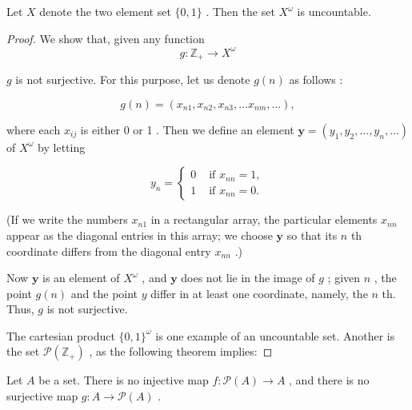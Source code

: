 \begin{theorem} Let \(X\) denote the two element set \(\{ 0,1\}\) . Then the set \({X}^{\omega }\) is uncountable.
\end{theorem}

\begin{proof}We show that, given any function
\[
g : {\mathbb{Z}}_{ + } \rightarrow  {X}^{\omega }
\]

\(g\) is not surjective. For this purpose, let us denote \(g\left( n\right)\) as follows :

\[
g\left( n\right)  = \left( {{x}_{n1},{x}_{n2},{x}_{n3},\ldots {x}_{nm},\ldots }\right) ,
\]

where each \({x}_{ij}\) is either 0 or 1 . Then we define an element \(\mathbf{y} = \left( {{y}_{1},{y}_{2},\ldots ,{y}_{n},\ldots }\right)\) of \({X}^{\omega }\) by letting

\[
{y}_{n} = \left\{  \begin{array}{ll} 0 & \text{ if }{x}_{nn} = 1, \\  1 & \text{ if }{x}_{nn} = 0. \end{array}\right.
\]

(If we write the numbers \({x}_{n1}\) in a rectangular array, the particular elements \({x}_{nn}\) appear as the diagonal entries in this array; we choose \(\mathbf{y}\) so that its \(n\) th coordinate differs from the diagonal entry \({x}_{nn}\) .)

Now \(\mathbf{y}\) is an element of \({X}^{\omega }\) , and \(\mathbf{y}\) does not lie in the image of \(g\) ; given \(n\) , the point \(g\left( n\right)\) and the point \(y\) differ in at least one coordinate, namely, the \(n\) th. Thus, \(g\) is not surjective.

The cartesian product \(\{ 0,1{\} }^{\omega }\) is one example of an uncountable set. Another is the set \(\mathcal{P}\left( {\mathbb{Z}}_{ + }\right)\) , as the following theorem implies:
\end{proof}
\begin{theorem} Let \(A\) be a set. There is no injective map \(f : \mathcal{P}\left( A\right)  \rightarrow  A\) , and there is no surjective map \(g : A \rightarrow  \mathcal{P}\left( A\right)\) .
\end{theorem}

